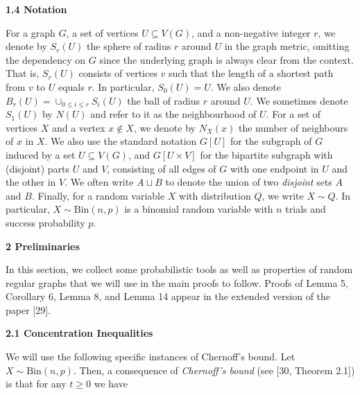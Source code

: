 \par\medskip\noindent\textbf{
1.4 Notation}\par




For a graph $G$, a set of vertices $U\subseteq V(G)$, and a non-negative integer $r$, we denote by $S_{r}(U)$ the sphere of radius $r$ around $U$ in the graph metric, omitting the dependency on $G$ since the underlying graph is always clear from the context. That is, $S_{r}(U)$ consists of vertices $v$ such that the length of a shortest path from $v$ to $U$ equals $r$. In particular, $S_{0}(U)=U$. We also denote $B_{r}(U)=\cup_{0\leq i\leq r}S_{i}(U)$ the ball of radius $r$ around $U$. We sometimes denote $S_{1}(U)$ by $N(U)$ and refer to it as the neighbourhood of $U$. For a set of vertices $X$ and a vertex $x\notin X$, we denote by $N_{X}(x)$ the number of neighbours of $x$ in $X$. We also use the standard notation $G[U]$ for the subgraph of $G$ induced by a set $U\subseteq V(G)$, and $G[U\times V]$ for the bipartite subgraph with (disjoint) parts $U$ and $V$, consisting of all edges of $G$ with one endpoint in $U$ and the other in $V$. We often write $A\sqcup B$ to denote the union of two \emph{disjoint} sets $A$ and $B$. Finally, for a random variable $X$ with distribution $Q$, we write $X\sim Q$. In particular, $X\sim\mathrm{Bin}(n,p)$ is a binomial random variable with $n$ trials and success probability $p$.\par






\par\medskip\noindent\textbf{
2 Preliminaries}\par




In this section, we collect some probabilistic tools as well as properties of random regular graphs that we will use in the main proofs to follow. Proofs of Lemma 5, Corollary 6, Lemma 8, and Lemma 14 appear in the extended version of the paper [29].\par




\par\medskip\noindent\textbf{
2.1 Concentration Inequalities}\par




We will use the following specific instances of Chernoff’s bound. Let $X\sim\textrm{Bin}(n,p)$. Then, a consequence of \emph{Chernoff’s bound} (see [30, Theorem 2.1]) is that for any $t\geq 0$ we have\par


